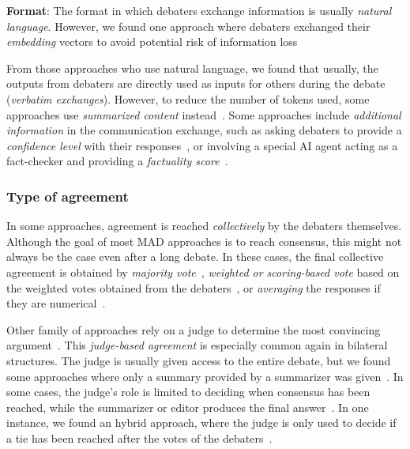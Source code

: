 \documentclass[conference]{IEEEtran}
\begin{document}
\textbf{Format}: 
The format in which debaters exchange information is usually \textit{natural language}. However, we found one approach where debaters exchanged their \textit{embedding} vectors to avoid potential risk of information loss~\cite{s14-pham-2024}

From those approaches who use natural language, we found that usually, the outputs from debaters are directly used as inputs for others during the debate (\textit{verbatim exchanges}). However, to reduce the number of tokens used, some approaches use \textit{summarized content} instead~\cite{p20-Jeptoo-2025, p28-chan-2024}. Some approaches include \textit{additional information} in the communication exchange, such as asking debaters to provide a \textit{confidence level} with their responses~\cite{p16-Bai-2024, s23-chen-2024}, or involving a special AI agent acting as a fact-checker and providing a \textit{factuality score}~\cite{s09-yang-2024}. 

\subsubsection{Type of agreement}

In some approaches, agreement is reached \textit{collectively} by the debaters themselves. Although the goal of most MAD approaches is to reach consensus, this might not always be the case even after a long debate. In these cases, the final collective agreement is obtained by \textit{majority vote}~\cite{p03-li-2024, p16-Bai-2024, p20-Jeptoo-2025, p28-chan-2024, s09-yang-2024, s14-pham-2024, s17-du-2024, s28-xu-2023}, \textit{weighted or scoring-based vote} based on the weighted votes obtained from the debaters~\cite{p11-Huang-2024, s23-chen-2024}, or \textit{averaging} the responses if they are numerical~\cite{p28-chan-2024, s09-yang-2024}.

Other family of approaches rely on a judge to determine the most convincing argument~\cite{p02-fang-2025, p04-liang-2024, p09-lim-2024, s05-wang-2024, s11-Yu-He-2024, s12-xiong-2023}. This \textit{judge-based agreement} is especially common again in bilateral structures. The judge is usually given access to the entire debate, but we found some approaches where only a summary provided by a summarizer was given~\cite{p09-lim-2024}. In some cases, the judge’s role is limited to deciding when consensus has been reached, while the summarizer or editor produces the final answer~\cite{p17-wang-2025, p21-wang-2024}. 
In one instance, we found an hybrid approach, where the judge is only used to decide if a tie has been reached after the votes of the debaters~\cite{s24-wang-2024}.
\end{document}
